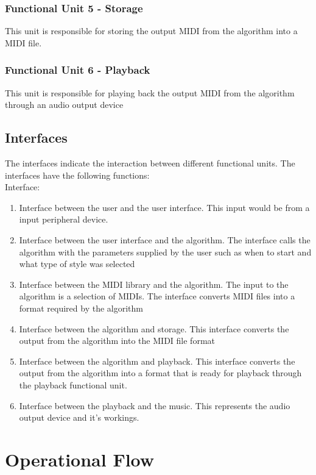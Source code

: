 \subsection{Functional Unit 5 - Storage}
This unit is responsible for storing the output \ac{MIDI} from the algorithm into a \ac{MIDI} file.

\subsection{Functional Unit 6 - Playback}
This unit is responsible for playing back the output \ac{MIDI} from the algorithm through an audio output device

\section{Interfaces}
The interfaces indicate the interaction between different functional units.
The interfaces have the following functions:
\\Interface:
\begin{enumerate}
\item Interface between the user and the user interface. This input would be from a input peripheral device.
\item Interface between the user interface and the algorithm. The interface calls the algorithm with the parameters supplied by the user such as when to start and what type of style was selected
\item Interface between the \ac{MIDI} library and the algorithm. The input to the algorithm is a selection of \acp{MIDI}. The interface converts \ac{MIDI} files into a format required by the algorithm
\item Interface between the algorithm and storage. This interface converts the output from the algorithm into the \ac{MIDI} file format
\item Interface between the algorithm and playback. This interface converts the output from the algorithm into a format that is ready for playback through the playback functional unit.
\item Interface between the playback and the music. This represents the audio output device and it's workings.
\end{enumerate}

\chapter{Operational Flow}

